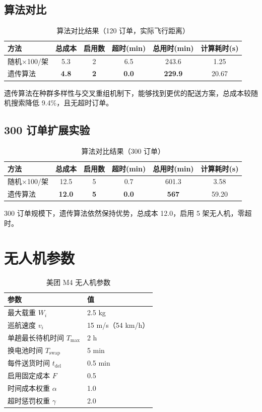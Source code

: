 \documentclass[12pt,a4paper]{article}
\begin{document}
\subsection{算法对比}

\begin{table}[h]
\centering
\caption{算法对比结果（120 订单，实际飞行距离）}
\begin{tabular}{lccccc}
\toprule
方法 & 总成本 & 启用数 & 超时(min) & 总用时(min) & 计算耗时(s) \\
\midrule
随机$\times$100/架 & 5.3 & 2 & 6.5 & 243.6 & 1.25 \\
遗传算法 & \textbf{4.8} & \textbf{2} & \textbf{0.0} & \textbf{229.9} & 20.67 \\
\bottomrule
\end{tabular}
\end{table}

遗传算法在种群多样性与交叉重组机制下，能够找到更优的配送方案，总成本较随机搜索降低 9.4\%，且无超时订单。

\subsection{300 订单扩展实验}

\begin{table}[h]
\centering
\caption{算法对比结果（300 订单）}
\begin{tabular}{lccccc}
\toprule
方法 & 总成本 & 启用数 & 超时(min) & 总用时(min) & 计算耗时(s) \\
\midrule
随机$\times$100/架 & 12.5 & 5 & 0.7 & 601.3 & 3.58 \\
遗传算法 & \textbf{12.0} & \textbf{5} & \textbf{0.0} & \textbf{567} & 59.20 \\
\bottomrule
\end{tabular}
\end{table}

300 订单规模下，遗传算法依然保持优势，总成本 12.0，启用 5 架无人机，零超时。

\section{无人机参数}

\begin{table}[h]
\centering
\caption{美团 M4 无人机参数}
\begin{tabular}{ll}
\toprule
参数 & 值 \\
\midrule
最大载重 $W_i$ & 2.5 kg \\
巡航速度 $v_i$ & 15 m/s（54 km/h） \\
单趟最长待机时间 $T_{\max}$ & 2 h \\
换电池时间 $T_{\text{swap}}$ & 5 min \\
每件送货时间 $t_{\text{del}}$ & 0.5 min \\
启用固定成本 $F$ & 0.5 \\
时间成本权重 $\alpha$ & 1.0 \\
超时惩罚权重 $\gamma$ & 2.0 \\
\bottomrule
\end{tabular}
\end{table}
\end{document}
